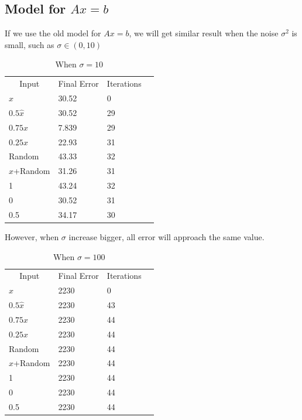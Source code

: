\documentclass[a4paper]{article}
\begin{document}
\subsection{Model for $Ax=b$}
    If we use the old model for $Ax=b$, we will get similar result when the noise $\sigma^2$ is small, such as $\sigma\in(0,10)$
    \begin{table}[H]
        \centering
        \begin{tabular}{|l|l|l|l}
        \cline{1-3}
        \multicolumn{1}{|c|}{Input} & \multicolumn{1}{c|}{Final Error} & \multicolumn{1}{c|}{Iterations} &  \\ \cline{1-3}
        $\hat{x}$       &  30.52    &0      &  \\ \cline{1-3}
        $0.5\hat{x}$    &  30.52    &29    &  \\ \cline{1-3}
        $0.75x$         &  7.839    &29    &  \\ \cline{1-3}
        $0.25x$         &  22.93    &31    &  \\ \cline{1-3}
        Random          &  43.33    &32    &  \\ \cline{1-3}
        $x$+Random      &  31.26    &31    &  \\ \cline{1-3}
        1               &  43.24    &32    &  \\ \cline{1-3}
        0               &  30.52    &31    &  \\ \cline{1-3}
        0.5             &  34.17    &30    &  \\ \cline{1-3}
        \end{tabular}
        \caption{When $\sigma=10$}
    \end{table}
    However, when $\sigma$ increase bigger, all error will approach the same value.
    \begin{table}[H]
        \centering
        \begin{tabular}{|l|l|l|l}
        \cline{1-3}
        \multicolumn{1}{|c|}{Input} & \multicolumn{1}{c|}{Final Error} & \multicolumn{1}{c|}{Iterations} &  \\ \cline{1-3}
        $\hat{x}$       &  2230     &0      &  \\ \cline{1-3}
        $0.5\hat{x}$    &  2230     &43     &  \\ \cline{1-3}
        $0.75x$         &  2230     &44     &  \\ \cline{1-3}
        $0.25x$         &  2230     &44     &  \\ \cline{1-3}
        Random          &  2230     &44     &  \\ \cline{1-3}
        $x$+Random      &  2230     &44     &  \\ \cline{1-3}
        1               &  2230     &44     &  \\ \cline{1-3}
        0               &  2230     &44     &  \\ \cline{1-3}
        0.5             &  2230     &44     &  \\ \cline{1-3}
        \end{tabular}
        \caption{When $\sigma=100$}
    \end{table}
\end{document}
